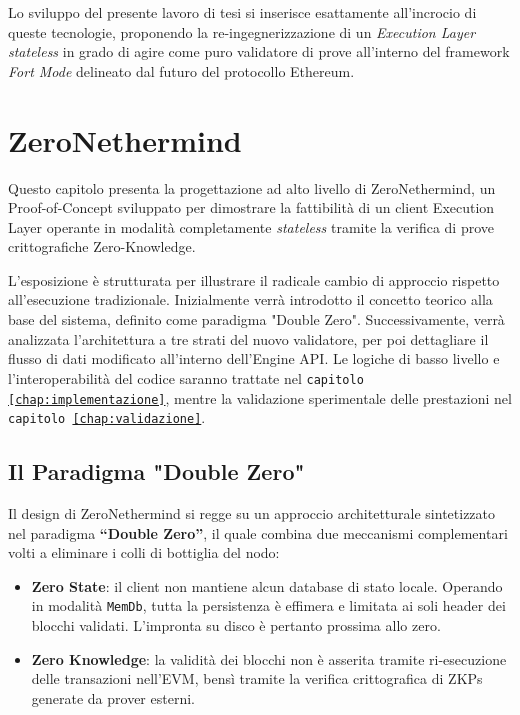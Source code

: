 \documentclass[12pt,a4paper,openright,twoside]{report}
\begin{document}
Lo sviluppo del presente lavoro di tesi si inserisce esattamente all'incrocio di queste tecnologie, proponendo la re-ingegnerizzazione di un \textit{Execution Layer} \textit{stateless} in grado di agire come puro validatore di prove all'interno del framework \textit{Fort Mode} delineato dal futuro del protocollo Ethereum.

\chapter{ZeroNethermind}\label{chap:zeronethermind}

Questo capitolo presenta la progettazione ad alto livello di ZeroNethermind, un Proof-of-Concept sviluppato per dimostrare la fattibilità di un client Execution Layer operante in modalità completamente \textit{stateless} tramite la verifica di prove crittografiche Zero-Knowledge.

L'esposizione è strutturata per illustrare il radicale cambio di approccio rispetto all'esecuzione tradizionale. Inizialmente verrà introdotto il concetto teorico alla base del sistema, definito come paradigma "Double Zero". Successivamente, verrà analizzata l'architettura a tre strati del nuovo validatore, per poi dettagliare il flusso di dati modificato all'interno dell'Engine API. Le logiche di basso livello e l'interoperabilità del codice saranno trattate nel \texttt{capitolo \ref{chap:implementazione}}, mentre la validazione sperimentale delle prestazioni nel \texttt{capitolo \ref{chap:validazione}}.

\section{Il Paradigma "Double Zero"}

Il design di ZeroNethermind si regge su un approccio architetturale sintetizzato nel paradigma \textbf{``Double Zero''}, il quale combina due meccanismi complementari volti a eliminare i colli di bottiglia del nodo:
\begin{itemize}
    \item \textbf{Zero State}: il client non mantiene alcun database di stato locale. Operando in modalità \texttt{MemDb}, tutta la persistenza è effimera e limitata ai soli header dei blocchi validati. L'impronta su disco è pertanto prossima allo zero.
    \item \textbf{Zero Knowledge}: la validità dei blocchi non è asserita tramite ri-esecuzione delle transazioni nell'EVM, bensì tramite la verifica crittografica di ZKPs generate da prover esterni.
\end{itemize}
\end{document}
